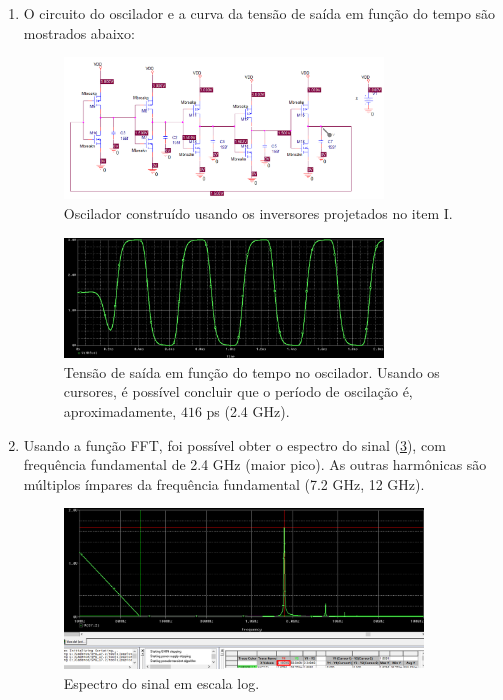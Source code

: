 \documentclass[11pt]{article}
\begin{document}
\begin{enumerate}[label=\alph*)]

\item O circuito do oscilador e a curva da tensão de saída em função do tempo são mostrados abaixo:

\begin{figure}
    \centering
    \includegraphics[width=0.8\textwidth]{imgs/oscilador.png}
    \caption{Oscilador construído usando os inversores projetados no item I.}
    \label{fig:oscilador}
\end{figure}

\begin{figure}
    \centering
    \includegraphics[width=0.8\textwidth]{imgs/saida_oscilador.png}
    \caption{Tensão de saída em função do tempo no oscilador. Usando os cursores, é possível concluir que o período de oscilação é, aproximadamente, $416$ ps (2.4 GHz).}
    \label{fig:saida_oscilador}
\end{figure}

\item Usando a função FFT, foi possível obter o espectro do sinal (\cref{fig:fft}), com frequência fundamental de 2.4 GHz (maior pico). As outras harmônicas são múltiplos ímpares da frequência fundamental (7.2 GHz, 12 GHz).

\begin{figure}
    \centering
    \includegraphics[width=0.9\textwidth]{imgs/fft.png}
    \caption{Espectro do sinal em escala log.}
    \label{fig:fft}
\end{figure}


\end{enumerate}
\end{document}

